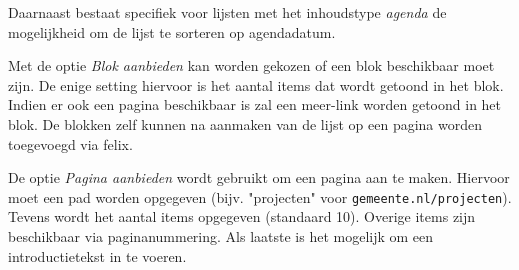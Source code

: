 Daarnaast bestaat specifiek voor lijsten met het inhoudstype \emph{agenda} de mogelijkheid om de lijst te sorteren op agendadatum.

Met de optie \emph{Blok aanbieden} kan worden gekozen of een blok beschikbaar moet zijn. De enige setting hiervoor is het aantal items dat wordt getoond in het blok. Indien er ook een pagina beschikbaar is zal een meer-link worden getoond in het blok. De blokken zelf kunnen na aanmaken van de lijst op een pagina worden toegevoegd via felix.

De optie \emph{Pagina aanbieden} wordt gebruikt om een pagina aan te maken. Hiervoor moet een pad worden opgegeven (bijv. "projecten" voor \texttt{gemeente.nl/projecten}). Tevens wordt het aantal items opgegeven (standaard 10). Overige items zijn beschikbaar via paginanummering. Als laatste is het mogelijk om een introductietekst in te voeren.